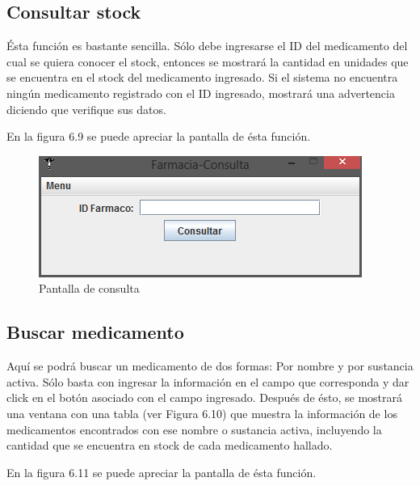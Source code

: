 \subsection{Consultar stock}
\'Esta funci\'on es bastante sencilla. S\'olo debe ingresarse el ID del medicamento del cual se quiera conocer el stock, entonces se mostrar\'a la cantidad en unidades que se encuentra en el stock del medicamento ingresado. Si el sistema no encuentra ning\'un medicamento registrado con el ID ingresado, mostrar\'a una advertencia diciendo que verifique sus datos.

En la figura 6.9 se puede apreciar la pantalla de \'esta funci\'on.

\begin{figure}[htbp!]
		\centering		
	\end{figure}
\begin{figure}[htbp!]
\centering
		\includegraphics[width=.5\textwidth]{images/gui/IUConsulta}
		\caption{Pantalla de consulta}
\end{figure}


\subsection{Buscar medicamento}
Aqu\'i se podr\'a buscar un medicamento de dos formas: Por nombre y por sustancia activa. S\'olo basta con ingresar la informaci\'on en el campo que corresponda y dar click en el bot\'on asociado con el campo ingresado. Despu\'es de \'esto, se mostrar\'a una ventana con una tabla (ver Figura 6.10) que muestra la informaci\'on de los medicamentos encontrados con ese nombre o sustancia activa, incluyendo la cantidad que se encuentra en stock de cada medicamento hallado.

En la figura 6.11 se puede apreciar la pantalla de \'esta funci\'on.

